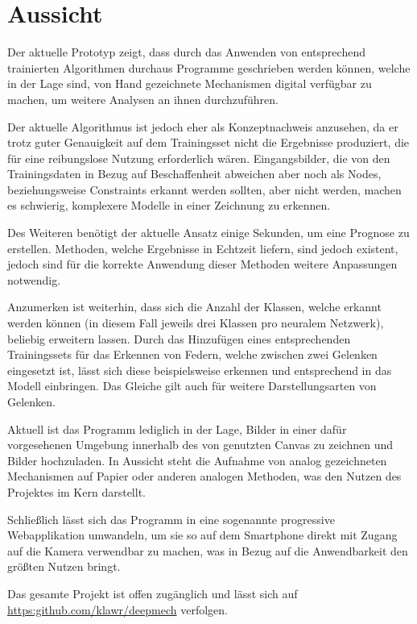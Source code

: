 \section{Aussicht}
Der aktuelle Prototyp zeigt, dass durch das Anwenden von entsprechend trainierten Algorithmen durchaus Programme geschrieben werden können, welche in der Lage sind, von Hand gezeichnete Mechanismen digital verfügbar zu machen, um weitere Analysen an ihnen durchzuführen.

Der aktuelle Algorithmus ist jedoch eher als Konzeptnachweis anzusehen, da er trotz guter Genauigkeit auf dem Trainingsset nicht die Ergebnisse produziert, die für eine reibungslose Nutzung erforderlich wären.
Eingangsbilder, die von den Trainingsdaten in Bezug auf Beschaffenheit abweichen aber noch als Nodes, beziehungsweise Constraints erkannt werden sollten, aber nicht werden, machen es schwierig, komplexere Modelle in einer Zeichnung zu erkennen.

Des Weiteren benötigt der aktuelle Ansatz einige Sekunden, um eine Prognose zu erstellen.
Methoden, welche Ergebnisse in Echtzeit liefern, sind jedoch existent\cite{Redmon2015}\cite{Redmon2016}\cite{Redmon2018}, jedoch sind für die korrekte Anwendung dieser Methoden weitere Anpassungen notwendig.

Anzumerken ist weiterhin, dass sich die Anzahl der Klassen, welche erkannt werden können (in diesem Fall jeweils drei Klassen pro neuralem Netzwerk), beliebig erweitern lassen.
Durch das Hinzufügen eines entsprechenden Trainingssets für das Erkennen von Federn, welche zwischen zwei Gelenken eingesetzt ist, lässt sich diese beispielsweise erkennen und entsprechend in das  Modell einbringen.
Das Gleiche gilt auch für weitere Darstellungsarten von Gelenken.

Aktuell ist das Programm lediglich in der Lage, Bilder in einer dafür vorgesehenen Umgebung innerhalb des von  genutzten Canvas zu zeichnen und Bilder hochzuladen.
In Aussicht steht die Aufnahme von analog gezeichneten Mechanismen auf Papier oder anderen analogen Methoden, was den Nutzen des Projektes im Kern darstellt.

Schließlich lässt sich das Programm in eine sogenannte progressive Webapplikation umwandeln, um sie so auf dem Smartphone direkt mit Zugang auf die Kamera verwendbar zu machen, was in Bezug auf die Anwendbarkeit den größten Nutzen bringt.

Das gesamte Projekt ist offen zugänglich und lässt sich auf \url{https:github.com/klawr/deepmech} verfolgen.
